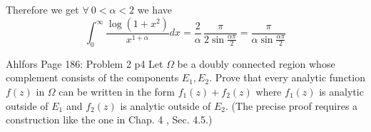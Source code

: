 \documentclass[a4paper, 11pt]{article}
\begin{document}
{\begin{enumerate}[label=(\alph*)]
Therefore we get $\forall\ 0<\alpha <2$ we have $$	\int_0^{\infty} \frac{\log \left(1+x^2\right)}{x^{1+\alpha}} d x=\frac{2}{\alpha} \, \frac{\pi}{2\sin \frac{\alpha \pi}{2}}=\frac{\pi}{\alpha\sin \frac{\alpha \pi}{2}}$$

		\end{enumerate}	}
	



	

	
	\begin{problem}{%
			Ahlfors Page 186: Problem 2
		}{p4%
		}
Let $\Omega$ be a doubly connected region whose complement consists of the components $E_1, E_2$. Prove that every analytic function $f(z)$ in $\Omega$ can be written in the form $f_1(z)+f_2(z)$ where $f_1(z)$ is analytic outside of $E_1$ and $f_2(z)$ is analytic outside of $E_2$. (The precise proof requires a construction like the one in Chap. 4 , Sec. 4.5.)	\end{problem}
	
	\solve{
	}
	
\end{document}
